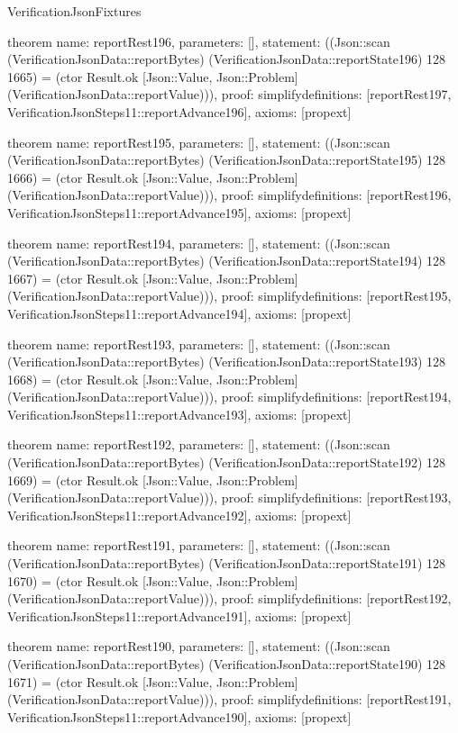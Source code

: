 \begin{lexlean}{VerificationJsonFixtures}
\begin{semanticmodule}
theorem{
  name: reportRest196,
  parameters: [],
  statement: ((Json::scan (VerificationJsonData::reportBytes) (VerificationJsonData::reportState196) 128 1665) = (ctor Result.ok [Json::Value, Json::Problem] (VerificationJsonData::reportValue))),
  proof: simplify{definitions: [reportRest197, VerificationJsonSteps11::reportAdvance196]},
  axioms: [propext]
}

theorem{
  name: reportRest195,
  parameters: [],
  statement: ((Json::scan (VerificationJsonData::reportBytes) (VerificationJsonData::reportState195) 128 1666) = (ctor Result.ok [Json::Value, Json::Problem] (VerificationJsonData::reportValue))),
  proof: simplify{definitions: [reportRest196, VerificationJsonSteps11::reportAdvance195]},
  axioms: [propext]
}

theorem{
  name: reportRest194,
  parameters: [],
  statement: ((Json::scan (VerificationJsonData::reportBytes) (VerificationJsonData::reportState194) 128 1667) = (ctor Result.ok [Json::Value, Json::Problem] (VerificationJsonData::reportValue))),
  proof: simplify{definitions: [reportRest195, VerificationJsonSteps11::reportAdvance194]},
  axioms: [propext]
}

theorem{
  name: reportRest193,
  parameters: [],
  statement: ((Json::scan (VerificationJsonData::reportBytes) (VerificationJsonData::reportState193) 128 1668) = (ctor Result.ok [Json::Value, Json::Problem] (VerificationJsonData::reportValue))),
  proof: simplify{definitions: [reportRest194, VerificationJsonSteps11::reportAdvance193]},
  axioms: [propext]
}

theorem{
  name: reportRest192,
  parameters: [],
  statement: ((Json::scan (VerificationJsonData::reportBytes) (VerificationJsonData::reportState192) 128 1669) = (ctor Result.ok [Json::Value, Json::Problem] (VerificationJsonData::reportValue))),
  proof: simplify{definitions: [reportRest193, VerificationJsonSteps11::reportAdvance192]},
  axioms: [propext]
}

theorem{
  name: reportRest191,
  parameters: [],
  statement: ((Json::scan (VerificationJsonData::reportBytes) (VerificationJsonData::reportState191) 128 1670) = (ctor Result.ok [Json::Value, Json::Problem] (VerificationJsonData::reportValue))),
  proof: simplify{definitions: [reportRest192, VerificationJsonSteps11::reportAdvance191]},
  axioms: [propext]
}

theorem{
  name: reportRest190,
  parameters: [],
  statement: ((Json::scan (VerificationJsonData::reportBytes) (VerificationJsonData::reportState190) 128 1671) = (ctor Result.ok [Json::Value, Json::Problem] (VerificationJsonData::reportValue))),
  proof: simplify{definitions: [reportRest191, VerificationJsonSteps11::reportAdvance190]},
  axioms: [propext]
}


\end{semanticmodule}
\end{lexlean}
